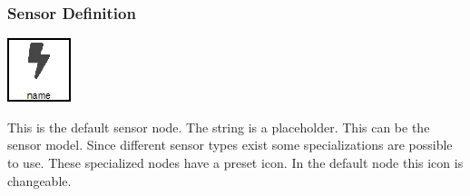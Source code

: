 \subsubsection{Sensor Definition}
\noindent\begin{minipage}{0.15\textwidth}%
	\includegraphics[width=\linewidth]{assets/images/sensor7}
\end{minipage}%
\hfill%
\begin{minipage}{0.8\textwidth}
	This is the default sensor node. The string  is a placeholder. This can be the sensor model. Since different sensor types exist some specializations are possible to use. These specialized nodes have a preset icon. In the default node this icon is changeable.
\end{minipage}

